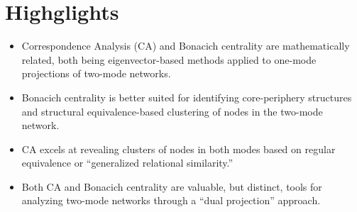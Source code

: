\documentclass{article}
\begin{document}
\section*{Highglights}

\begin{itemize}
    \item Correspondence Analysis (CA) and Bonacich centrality are mathematically related, both being eigenvector-based methods applied to one-mode projections of two-mode networks.
    \item Bonacich centrality is better suited for identifying core-periphery structures and structural equivalence-based clustering of nodes in the two-mode network.
    \item CA excels at revealing clusters of nodes in both modes based on regular equivalence or ``generalized relational similarity.''
    \item Both CA and Bonacich centrality are valuable, but distinct, tools for analyzing two-mode networks through a ``dual projection'' approach.
\end{itemize}
\end{document}

